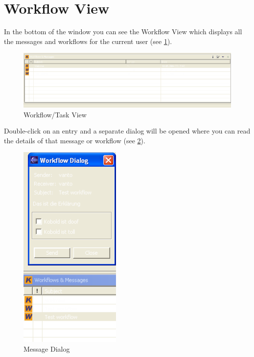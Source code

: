 \section{Workflow View}

In the bottom of the window you can see the Workflow View which displays all 
the messages and workflows for the current user (see \ref{workflow}). 

\begin{figure}[h!]
\begin{center}
\includegraphics[width=15cm]{workflow.png}
   \caption{Workflow/Task View}
\label{workflow}
\end{center}
\end{figure}\par

Double-click on an entry and a 
separate dialog will be opened where you can read the details of that message or
workflow (see \ref{workflowdialog}).

\begin{figure}[h!]
\begin{center}
\includegraphics[width=5cm]{workflowdialog.png}
   \caption{Message Dialog}
\label{workflowdialog}
\end{center}
\end{figure}\par

